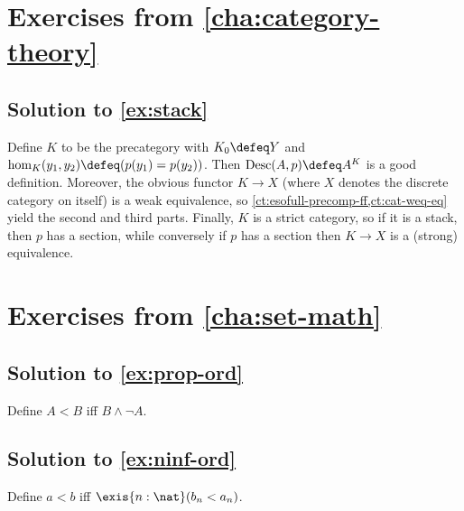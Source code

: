 \documentclass[
%
%
11pt %
]{article}
\begin{document}
\section*{Exercises from \cref{cha:category-theory}}

\subsection*{Solution to \cref{ex:stack}}

Define $K$ to be the precategory with $K_0 \defeq Y$ and $\hom_K(y_1,y_2) \defeq (p(y_1)=p(y_2))$.
Then $\mathrm{Desc}(A,p)\defeq A^K$ is a good definition.
Moreover, the obvious functor $K\to X$ (where $X$ denotes the discrete category on itself) is a weak equivalence, so \cref{ct:esofull-precomp-ff,ct:cat-weq-eq} yield the second and third parts.
Finally, $K$ is a strict category, so if it is a stack, then $p$ has a section, while conversely if $p$ has a section then $K\to X$ is a (strong) equivalence.

\section*{Exercises from \cref{cha:set-math}}

\subsection*{Solution to \cref{ex:prop-ord}}

Define $A<B$ iff $B \land \neg A$.

\subsection*{Solution to \cref{ex:ninf-ord}}

Define $a<b$ iff $\exis{n:\nat} (b_n < a_n)$.
\end{document}
